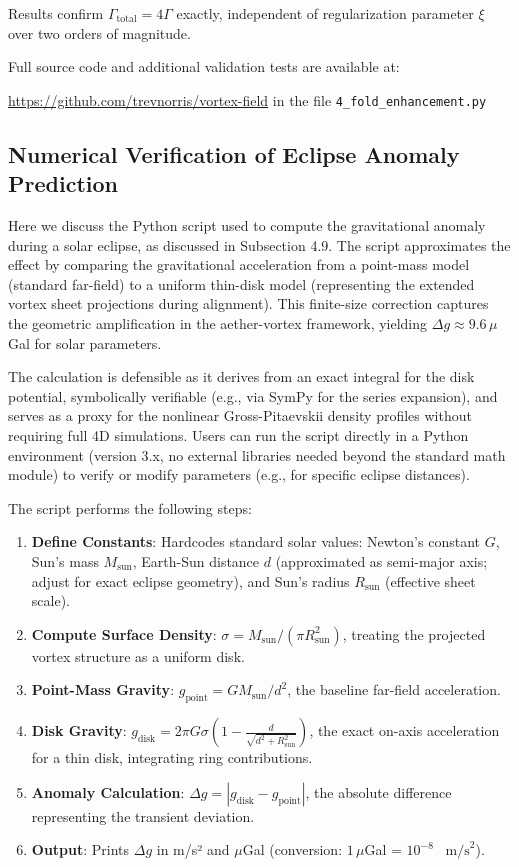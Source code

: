 \documentclass{article}
\begin{document}
Results confirm $\Gamma_{\text{total}} = 4\Gamma$ exactly, independent of regularization parameter $\xi$ over two orders of magnitude.

Full source code and additional validation tests are available at:

\noindent\url{https://github.com/trevnorris/vortex-field} in the file \verb|4_fold_enhancement.py|

\subsection{Numerical Verification of Eclipse Anomaly Prediction}

Here we discuss the Python script used to compute the gravitational anomaly during a solar eclipse, as discussed in Subsection 4.9. The script approximates the effect by comparing the gravitational acceleration from a point-mass model (standard far-field) to a uniform thin-disk model (representing the extended vortex sheet projections during alignment). This finite-size correction captures the geometric amplification in the aether-vortex framework, yielding \(\Delta g \approx 9.6 \, \mu\)Gal for solar parameters.

The calculation is defensible as it derives from an exact integral for the disk potential, symbolically verifiable (e.g., via SymPy for the series expansion), and serves as a proxy for the nonlinear Gross-Pitaevskii density profiles without requiring full 4D simulations. Users can run the script directly in a Python environment (version 3.x, no external libraries needed beyond the standard math module) to verify or modify parameters (e.g., for specific eclipse distances).

The script performs the following steps:

\begin{enumerate}
\item \textbf{Define Constants}: Hardcodes standard solar values: Newton's constant \(G\), Sun's mass \(M_{\text{sun}}\), Earth-Sun distance \(d\) (approximated as semi-major axis; adjust for exact eclipse geometry), and Sun's radius \(R_\text{sun}\) (effective sheet scale).
\item \textbf{Compute Surface Density}: \(\sigma = M_\text{sun} / (\pi R_\text{sun}^2)\), treating the projected vortex structure as a uniform disk.
\item \textbf{Point-Mass Gravity}: \(g_{\text{point}} = G M_\text{sun} / d^2\), the baseline far-field acceleration.
\item \textbf{Disk Gravity}: \(g_{\text{disk}} = 2 \pi G \sigma \left(1 - \frac{d}{\sqrt{d^2 + R_\text{sun}^2}}\right)\), the exact on-axis acceleration for a thin disk, integrating ring contributions.
\item \textbf{Anomaly Calculation}: \(\Delta g = |g_{\text{disk}} - g_{\text{point}}|\), the absolute difference representing the transient deviation.
\item \textbf{Output}: Prints \(\Delta g\) in m/s² and \(\mu\)Gal (conversion: \(1 \, \mu\)Gal = $10^{-8}$ \, $\text{m/s}^2$).
\end{enumerate}
\end{document}
